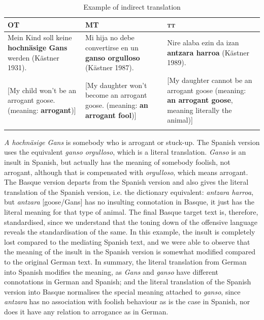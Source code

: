 \documentclass[output=paper]{LSP/langsci}
\begin{document}
\begin{table}
     \centering
     \begin{tabularx}{\textwidth}{XXX}
     \lsptoprule
OT 			& MT     & \textsc{tt}  \\ 
\midrule
Mein Kind soll keine \textbf{hochnäsige Gans} werden (Kästner 1931).   & Mi hija no debe convertirse en un \textbf{ganso orgulloso} (Kästner 1987).   & Nire alaba ezin da izan \textbf{antzara harroa} (Kästner 1989). \\ 
{[}My child won't be an arrogant goose. (meaning: \textbf{arrogant}){]} & {[}My daughter won't become an arrogant goose. (meaning: \textbf{an arrogant fool}){]}  & {[}My daughter cannot be an arrogant goose (meaning: \textbf{an arrogant goose}, meaning literally the animal){]}  \\

\lspbottomrule
\end{tabularx}

 \caption{Example of indirect translation}
     \label{3.3}
\end{table}


\textit{A hochnäsige Gans} is somebody who is arrogant or stuck-up. The Spanish version uses the equivalent \textit{ganso orgulloso}, which is a literal translation. \textit{Ganso} is an insult in Spanish, but actually has the meaning of somebody foolish, not arrogant, although that is compensated with \textit{orgulloso}, which means arrogant. The Basque version departs from the Spanish version and also gives the literal translation of the Spanish version, i.e. the dictionary equivalent: \textit{antzara harroa}, but \textit{antzara} [goose/Gans] has no insulting connotation in Basque, it just has the literal meaning for that type of animal. The final Basque target text is, therefore, standardised, since we understand that the toning down of the offensive language reveals the standardisation of the same. In this example, the insult is completely lost compared to the mediating Spanish text, and we were able to observe that the meaning of the insult in the Spanish version is somewhat modified compared to the original German text. In summary, the literal translation from German into Spanish modifies the meaning, as \textit{Gans} and \textit{ganso} have different connotations in German and Spanish; and the literal translation of the Spanish version into Basque normalises the special meaning attached to \textit{ganso}, since \textit{antzara} has no association with foolish behaviour as is the case in Spanish, nor does it have any relation to arrogance as in German.
\end{document}
